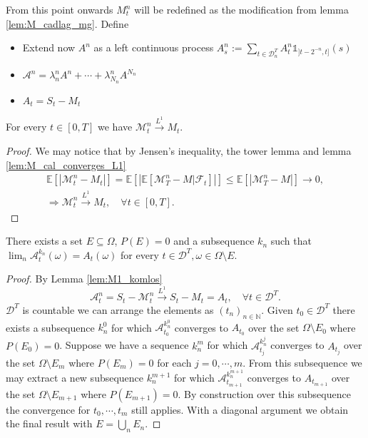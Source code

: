 From this point onwards $M^n_t$ will be redefined as the modification from lemma \ref{lem:M_cadlag_mg}.
Define
\begin{itemize}
  \item Extend now $A^n$ as a left continuous process $A^n_s:=\sum_{t\in\mathcal{D}^T_n}A^n_t\mathbb{1}_{]t-2^{-n},t]}(s)$
  \item $\mathcal{A}^n=\lambda^n_nA^n+\cdots +\lambda^n_{N_n}A^{N_n}$
  \item $A_t=S_t-M_t$
\end{itemize}

\begin{lemma}\label{lem:M1_komlos}
  For every $t\in[0,T]$ we have $\mathcal{M}^n_t\stackrel{L^1}{\rightarrow}M_t$.
\end{lemma}
\begin{proof}
  We may notice that by Jensen's inequality, the tower lemma and lemma \ref{lem:M_cal_converges_L1}
  \begin{gather}\nonumber
    \mathbb{E}[|\mathcal{M}^n_t-M_t|]=\mathbb{E}[|\mathbb{E}[\mathcal{M}^n_T-M\vert\mathcal{F}_t]|]\leq \mathbb{E}[|\mathcal{M}^n_T-M|]\rightarrow0,\\
    \Rightarrow\mathcal{M}^n_t\stackrel{L^1}{\rightarrow} M_t,\quad \forall t\in[0,T].\label{equation_DM_e7}
  \end{gather}
\end{proof}

\begin{lemma}\label{lem:A_cal_conv_A_on_D_T}
  There exists a set $E\subseteq\Omega$, $P(E)=0$ and a subsequence $k_n$ such that $\lim_n\mathcal{A}^{k_n}_t(\omega)=A_t(\omega)$ for every $t\in\mathcal{D}^T,\omega\in\Omega\setminus E$.
\end{lemma}
\begin{proof}
  By Lemma \ref{lem:M1_komlos}
  $$
  \mathcal{A}^n_t=S_t-\mathcal{M}^n_t\stackrel{L^1}{\rightarrow}S_t-M_t=A_t,\quad\forall t\in\mathcal{D}^T.
  $$
  $\mathcal{D}^T$ is countable we can arrange the elements as $(t_n)_{n\in\mathbb{N}}$.
  Given $t_0\in\mathcal{D}^T$ there exists a subsequence $k^{0}_n$ for which $\mathcal{A}^{k^{0}_n}_{t_0}$ converges to $A_{t_0}$ over the set $\Omega\setminus E_{0}$ where $P(E_{0})=0$.
  Suppose we have a sequence $k^m_n$ for which $\mathcal{A}^{k^j_n}_{t_j}$ converges to $A_{t_j}$ over the set $\Omega\setminus E_{m}$ where $P(E_{m})=0$ for each $j=0,\cdots,m$.
  From this subsequence we may extract a new subsequence $k^{m+1}_n$ for which $\mathcal{A}^{k^{m+1}_n}_{t_{m+1}}$ converges to $A_{t_{m+1}}$ over the set $\Omega\setminus E_{m+1}$ where $P(E_{m+1})=0$.
  By construction over this subsequence the convergence for $t_0,\cdots,t_m$ still applies.
  With a diagonal argument we obtain the final result with $E=\bigcup_n E_n$.
\end{proof}

